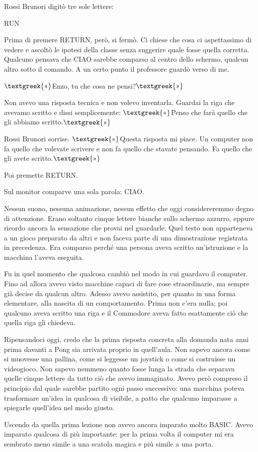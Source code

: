 \documentclass{article}
\begin{document}
Rossi Brunori digitò tre sole lettere:

RUN

Prima di premere RETURN, però, si fermò. Ci chiese che cosa ci aspettassimo di vedere e ascoltò le ipotesi della classe
senza suggerire quale fosse quella corretta. Qualcuno pensava che CIAO sarebbe comparso al centro dello schermo,
qualcun altro sotto il comando. A un certo punto il professore guardò verso di me.

$\text{\textgreek{«}}$Enzo, tu che cosa ne pensi?$\text{\textgreek{»}}$

Non avevo una risposta tecnica e non volevo inventarla. Guardai la riga che avevamo scritto e dissi semplicemente:
$\text{\textgreek{«}}$Penso che farà quello che gli abbiamo scritto.$\text{\textgreek{»}}$

Rossi Brunori sorrise. $\text{\textgreek{«}}$Questa risposta mi piace. Un computer non fa quello che volevate scrivere e
non fa quello che stavate pensando. Fa quello che gli avete scritto.$\text{\textgreek{»}}$

Poi premette RETURN.

Sul monitor comparve una sola parola: CIAO.

Nessun suono, nessuna animazione, nessun effetto che oggi considereremmo degno di attenzione. Erano soltanto cinque
lettere bianche sullo schermo azzurro, eppure ricordo ancora la sensazione che provai nel guardarle. Quel testo non
apparteneva a un gioco preparato da altri e non faceva parte di una dimostrazione registrata in precedenza. Era
comparso perché una persona aveva scritto un'istruzione e la macchina l'aveva eseguita.

Fu in quel momento che qualcosa cambiò nel modo in cui guardavo il computer. Fino ad allora avevo visto macchine capaci
di fare cose straordinarie, ma sempre già decise da qualcun altro. Adesso avevo assistito, per quanto in una forma
elementare, alla nascita di un comportamento. Prima non c'era nulla; poi qualcuno aveva scritto una riga e il Commodore
aveva fatto esattamente ciò che quella riga gli chiedeva.

Ripensandoci oggi, credo che la prima risposta concreta alla domanda nata anni prima davanti a Pong sia arrivata proprio
in quell'aula. Non sapevo ancora come si muovesse una pallina, come si leggesse un joystick o come si costruisse un
videogioco. Non sapevo nemmeno quanto fosse lunga la strada che separava quelle cinque lettere da tutto ciò che avevo
immaginato. Avevo però compreso il principio dal quale sarebbe partito ogni passo successivo: una macchina poteva
trasformare un'idea in qualcosa di visibile, a patto che qualcuno imparasse a spiegarle quell'idea nel modo giusto.

Uscendo da quella prima lezione non avevo ancora imparato molto BASIC. Avevo imparato qualcosa di più importante: per la
prima volta il computer mi era sembrato meno simile a una scatola magica e più simile a una porta.


\bigskip
\end{document}
